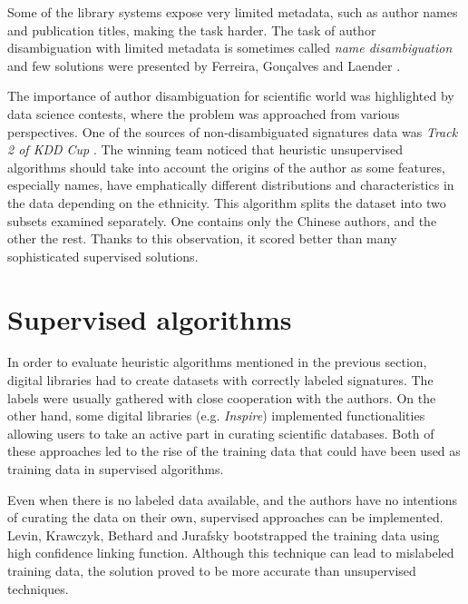 \documentclass{pracamgr}
\begin{document}
Some of the library systems expose very limited metadata, such as author names and
publication titles, making the task harder. The task of author disambiguation with limited
metadata is sometimes called \textit{name disambiguation} and few solutions were presented by
Ferreira, Gon\c{c}alves and Laender \citep{ferreira2014disambiguating}.

The importance of author disambiguation for scientific world was highlighted by
data science contests, where the problem was approached from various perspectives.
One of the sources of non-disambiguated signatures data was \textit{Track 2 of KDD Cup}
\citep{kdd}. The winning team noticed that heuristic unsupervised algorithms should take
into account the origins of the author \citep{chin14a} as some features, especially names,
have emphatically different distributions and characteristics in the data depending on the
ethnicity. This algorithm splits the dataset into two subsets examined separately. One
contains only the Chinese authors, and the other the rest. Thanks to this observation, it
scored better than many sophisticated supervised solutions.

\section{Supervised algorithms}\label{sec:related}


In order to evaluate heuristic algorithms mentioned in the previous section, digital
libraries had to create datasets with correctly labeled signatures. The labels were
usually gathered with close cooperation with the authors.
On the other hand, some digital libraries (e.g.
\textit{Inspire}) implemented functionalities allowing users to take an active part in
curating scientific databases.  Both of these approaches led to the rise of the training
data that could have been used as training data in supervised algorithms.

Even when there is no labeled data available, and the authors have no intentions of
curating the data on their own,
supervised approaches can be implemented. Levin, Krawczyk, Bethard and Jurafsky 
\citep{levin2012citation} bootstrapped the training data using high confidence
linking function. Although this technique can lead to mislabeled training data,
the solution proved to be more accurate than unsupervised techniques.
\end{document}
